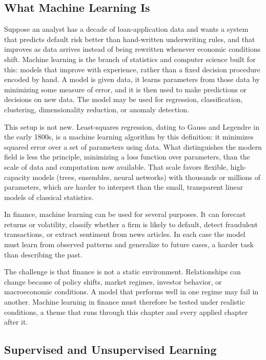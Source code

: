\documentclass[../ai_in_finance]{subfiles}
\begin{document}
\subsection{What Machine Learning Is}

Suppose an analyst has a decade of loan-application data and wants a system that predicts default risk better than hand-written underwriting rules, and that improves as data arrives instead of being rewritten whenever economic conditions shift. Machine learning is the branch of statistics and computer science built for this: models that improve with experience, rather than a fixed decision procedure encoded by hand. A model is given data, it learns parameters from those data by minimizing some measure of error, and it is then used to make predictions or decisions on new data. The model may be used for regression, classification, clustering, dimensionality reduction, or anomaly detection.

This setup is not new. Least-squares regression, dating to Gauss and Legendre in the early 1800s, is a machine learning algorithm by this definition: it minimizes squared error over a set of parameters using data. What distinguishes the modern field is less the principle, minimizing a loss function over parameters, than the scale of data and computation now available. That scale favors flexible, high-capacity models (trees, ensembles, neural networks) with thousands or millions of parameters, which are harder to interpret than the small, transparent linear models of classical statistics.

In finance, machine learning can be used for several purposes. It can forecast returns or volatility, classify whether a firm is likely to default, detect fraudulent transactions, or extract sentiment from news articles. In each case the model must learn from observed patterns and generalize to future cases, a harder task than describing the past.

The challenge is that finance is not a static environment. Relationships can change because of policy shifts, market regimes, investor behavior, or macroeconomic conditions. A model that performs well in one regime may fail in another. Machine learning in finance must therefore be tested under realistic conditions, a theme that runs through this chapter and every applied chapter after it.

\subsection{Supervised and Unsupervised Learning}
\end{document}
